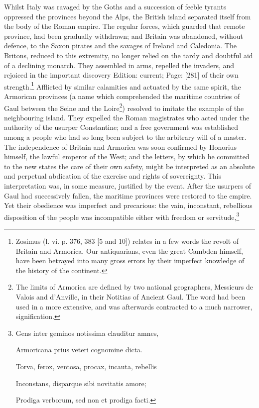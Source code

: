 Whilst Italy was ravaged by the Goths and a succession of feeble tyrants oppressed the provinces beyond the Alps, the British island separated itself from the body of the Roman empire. The regular forces, which guarded that remote province, had been gradually withdrawn; and Britain was abandoned, without defence, to the Saxon pirates and the savages of Ireland and Caledonia. The Britons, reduced to this extremity, no longer relied on the tardy and doubtful aid of a declining monarch. They assembled in arms, repelled the invaders, and rejoiced in the important discovery Edition: current; Page: [281] of their own strength.\footnote{Zosimus (l. vi. p. 376, 383 [5 and 10]) relates in a few words the revolt of Britain and Armorica. Our antiquarians, even the great Cambden himself, have been betrayed into many gross errors by their imperfect knowledge of the history of the continent.} Afflicted by similar calamities and actuated by the same spirit, the Armorican provinces (a name which comprehended the maritime countries of Gaul between the Seine and the Loire\footnote{The limits of Armorica are defined by two national geographers, Messieurs de Valois and d\texthebrew{}’Anville, in their Notitias of Ancient Gaul. The word had been used in a more extensive, and was afterwards contracted to a much narrower, signification.}) resolved to imitate the example of the neighbouring island. They expelled the Roman magistrates who acted under the authority of the usurper Constantine; and a free government was established among a people who had so long been subject to the arbitrary will of a master. The independence of Britain and Armorica was soon confirmed by Honorius himself, the lawful emperor of the West; and the letters, by which he committed to the new states the care of their own safety, might be interpreted as an absolute and perpetual abdication of the exercise and rights of sovereignty. This interpretation was, in some measure, justified by the event. After the usurpers of Gaul had successively fallen, the maritime provinces were restored to the empire. Yet their obedience was imperfect and precarious: the vain, inconstant, rebellious disposition of the people was incompatible either with freedom or servitude,\footnote{Gens inter geminos notissima clauditur amnes,

Armoricana prius veteri cognomine dicta.

Torva, ferox, ventosa, procax, incauta, rebellis

Inconstans, disparque sibi novitatis amore;

Prodiga verborum, sed non et prodiga facti.

}
